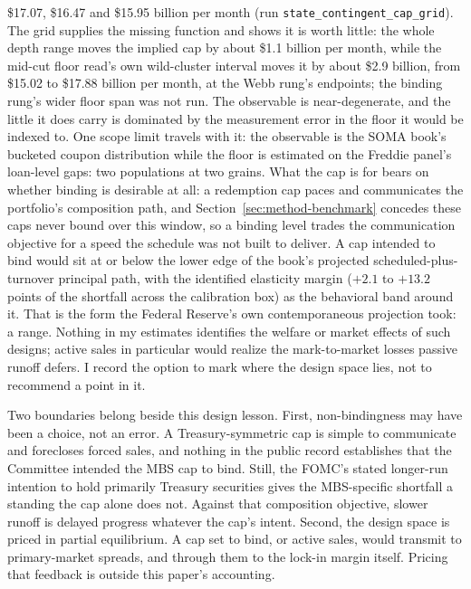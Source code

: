 \documentclass[12pt]{article}
\begin{document}
\$17.07, \$16.47 and \$15.95 billion per month (run \texttt{state\_contingent\_cap\_grid}). The grid supplies the missing function and shows it is worth little: the whole depth range moves the implied cap by about \$1.1 billion per month, while the mid-cut floor read's own wild-cluster interval moves it by about \$2.9 billion, from \$15.02 to \$17.88 billion per month, at the Webb rung's endpoints; the binding rung's wider floor span was not run. The observable is near-degenerate, and the little it does carry is dominated by the measurement error in the floor it would be indexed to. One scope limit travels with it: the observable is the SOMA book's bucketed coupon distribution while the floor is estimated on the Freddie panel's loan-level gaps: two populations at two grains. What the cap is for bears on whether binding is desirable at all: a redemption cap paces and communicates the portfolio's composition path, and Section~\ref{sec:method-benchmark} concedes these caps never bound over this window, so a binding level trades the communication objective for a speed the schedule was not built to deliver. A cap intended to bind would sit at or below the lower edge of the book's projected scheduled-plus-turnover principal path, with the identified elasticity margin ($+2.1$ to $+13.2$ points of the shortfall across the calibration box) as the behavioral band around it. That is the form the Federal Reserve's own contemporaneous projection took: a range. Nothing in my estimates identifies the welfare or market effects of such designs; active sales in particular would realize the mark-to-market losses passive runoff defers. I record the option to mark where the design space lies, not to recommend a point in it.

Two boundaries belong beside this design lesson. First, non-bindingness may have been a choice, not an error. A Treasury-symmetric cap is simple to communicate and forecloses forced sales, and nothing in the public record establishes that the Committee intended the MBS cap to bind. Still, the FOMC's stated longer-run intention to hold primarily Treasury securities gives the MBS-specific shortfall a standing the cap alone does not. Against that composition objective, slower runoff is delayed progress whatever the cap's intent. Second, the design space is priced in partial equilibrium. A cap set to bind, or active sales, would transmit to primary-market spreads, and through them to the lock-in margin itself. Pricing that feedback is outside this paper's accounting.
\end{document}
